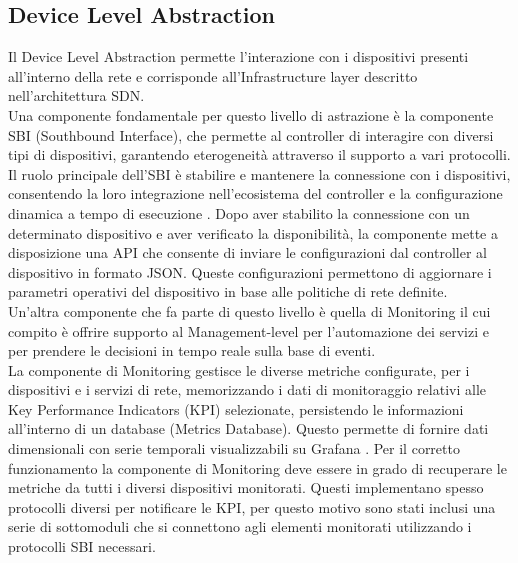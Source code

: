 \subsection{Device Level Abstraction}
Il Device Level Abstraction permette l'interazione con i dispositivi presenti all'interno della rete e corrisponde all'Infrastructure layer descritto nell'architettura SDN.
\\Una componente fondamentale per questo livello di astrazione è la componente SBI (Southbound Interface), che permette al controller di interagire con diversi tipi di dispositivi, garantendo eterogeneità attraverso il supporto a vari protocolli. 
Il ruolo principale dell'SBI è stabilire e mantenere la connessione con i dispositivi, consentendo la loro integrazione nell'ecosistema del controller e la configurazione dinamica a tempo di esecuzione \cite{D32}. 
Dopo aver stabilito la connessione con un determinato dispositivo e aver verificato la disponibilità,
la componente mette a disposizione una API che consente di inviare le configurazioni dal controller al dispositivo in formato JSON.
Queste configurazioni permettono di aggiornare i parametri operativi del dispositivo in base alle politiche di rete definite.
\\Un'altra componente che fa parte di questo livello è quella di Monitoring il cui compito è offrire supporto al Management-level
per l'automazione dei servizi e per prendere le decisioni in tempo reale sulla base di eventi.
\\La componente di Monitoring gestisce le diverse metriche configurate, per i dispositivi e i servizi di rete, memorizzando i dati di monitoraggio relativi alle Key Performance Indicators (KPI) selezionate, persistendo le informazioni all'interno di un database (Metrics Database).
Questo permette di fornire dati dimensionali con serie temporali visualizzabili su Grafana \cite{grafana}.
Per il corretto funzionamento la componente di Monitoring deve essere in grado di recuperare le metriche da tutti i diversi dispositivi monitorati.
Questi implementano spesso protocolli diversi per notificare le KPI, per questo motivo sono stati inclusi una serie di sottomoduli che si connettono 
agli elementi monitorati utilizzando i protocolli SBI necessari. %
